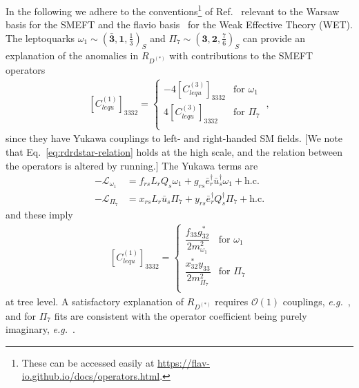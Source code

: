In the following we adhere to the conventions\footnote{These can be accessed
  easily at \url{https://flav-io.github.io/docs/operators.html}.} of
Ref.~\cite{Aebischer:2017ugx} relevant to the Warsaw basis for the SMEFT and the
\textsf{flavio} basis~\cite{Straub:2018kue} for the Weak Effective Theory (WET).
The leptoquarks
$\omega_{1} \sim (\mathbf{\bar{3}}, \mathbf{1}, \tfrac{1}{3})_{S}$ and
$\Pi_{7} \sim (\mathbf{3}, \mathbf{2}, \tfrac{7}{6})_{S}$ can provide an
explanation of the anomalies in $R_{D^{(*)}}$ with contributions to the SMEFT
operators
\begin{align}
  \label{eq:rdrdstar-relation}
  [C_{lequ}^{(1)}]_{3332} = \begin{cases}
    - 4 [C_{lequ}^{(3)}]_{3332} &\text{for } \omega_{1} \\
    4 [C_{lequ}^{(3)}]_{3332}  &\text{for } \Pi_{7} \\
  \end{cases} \ ,
\end{align}
since they have Yukawa couplings to left- and right-handed SM fields. [We note
that Eq.~\eqref{eq:rdrdstar-relation} holds at the high scale, and the relation
between the operators is altered by running.] The Yukawa terms are
\begin{align}
  - \mathcal{L}_{\omega_{1}} &= f_{rs} L_{r} Q_{s} \omega_{1} + g_{rs} \bar{e}^{\dagger}_{r} \bar{u}^{\dagger}_{s} \omega_{1} + \text{h.c.} \label{eq:omega1-coup} \\
  - \mathcal{L}_{\Pi_{7}} &= x_{rs} L_{r} \bar{u}_{s} \Pi_{7} + y_{rs} \bar{e}^{\dagger}_{r} Q^{\dagger}_{s} \Pi_{7} + \text{h.c.} \label{eq:pi7-coup}
\end{align}
and these imply
\begin{align}
  \label{eq:omega1-pi7-clequ}
  [C_{lequ}^{(1)}]_{3332} = \begin{cases}
    \dfrac{f_{33} g_{32}^{*}}{2 m_{\omega_{1}}^{2}} &\text{for } \omega_{1} \\
    \dfrac{x_{32}^{*}y_{33}}{2 m_{\Pi_{7}}^{2}} &\text{for } \Pi_{7} \\
  \end{cases}
\end{align}
at tree level. A satisfactory explanation of $R_{D^{(*)}}$ requires
$\mathcal{O}(1)$ couplings, \textit{e.g.}~\cite{Cai:2017wry, Popov:2019tyc}, and
for $\Pi_{7}$ fits are consistent with the operator coefficient being purely
imaginary, \textit{e.g.}~\cite{Angelescu:2018tyl}.

